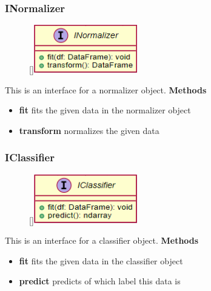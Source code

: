 \subsubsection{INormalizer}
\begin{figure}
    \raisebox{0pt}[\dimexpr{}\baselineskip\relax]{\includegraphics[width=4.5cm]{classes/model-management/10.png}}
\end{figure} 
\par
This is an interface for a normalizer object.
\newline
\newline
\textbf{Methods}
\begin{itemize}
    \item \textbf{fit} fits the given data in the normalizer object
    \item \textbf{transform} normalizes the given data
\end{itemize}

\subsubsection{IClassifier}
\begin{figure}
    \raisebox{0pt}[\dimexpr{}\baselineskip\relax]{\includegraphics[width=4.5cm]{classes/model-management/11.png}}
\end{figure} 
\par
This is an interface for a classifier object.
\newline
\newline
\textbf{Methods}
\begin{itemize}
    \item \textbf{fit} fits the given data in the classifier object
    \item \textbf{predict} predicts of which label this data is
\end{itemize}

